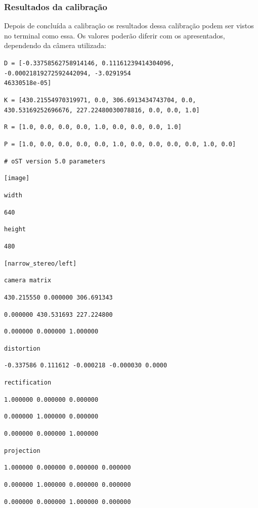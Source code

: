 \subsubsection{Resultados da calibração}

Depois de concluída a calibração os resultados dessa calibração podem ser vistos no terminal como essa. Os valores poderão diferir com os apresentados, dependendo da câmera utilizada:


{\setlength{\parindent}{0cm}

\texttt{D = {[}-0.33758562758914146, 0.11161239414304096, -0.00021819272592442094, -3.0291954\\46330518e-05{]}}

 \texttt{K = {[}430.21554970319971, 0.0, 306.6913434743704, 0.0, 430.53169252696676, 227.22480030078816, 0.0, 0.0, 1.0{]}}

\texttt{R = {[}1.0, 0.0, 0.0, 0.0, 1.0, 0.0, 0.0, 0.0, 1.0{]}}

\texttt{P = {[}1.0, 0.0, 0.0, 0.0, 0.0, 1.0, 0.0, 0.0, 0.0, 0.0, 1.0, 0.0{]}}

 \texttt{\# oST version 5.0 parameters}


 \texttt{{[}image{]}}


 \texttt{width}

 \texttt{640}



 \texttt{height}

 \texttt{480}



 \texttt{{[}narrow\_stereo/left{]}}


 \texttt{camera matrix}

 \texttt{430.215550 0.000000 306.691343}

 \texttt{0.000000 430.531693 227.224800}

 \texttt{0.000000 0.000000 1.000000}


 \texttt{distortion}

 \texttt{-0.337586 0.111612 -0.000218 -0.000030 0.0000}


 \texttt{rectification}

 \texttt{1.000000 0.000000 0.000000}

 \texttt{0.000000 1.000000 0.000000}

 \texttt{0.000000 0.000000 1.000000}


 \texttt{projection}

 \texttt{1.000000 0.000000 0.000000 0.000000}

 \texttt{0.000000 1.000000 0.000000 0.000000}

 \texttt{0.000000 0.000000 1.000000 0.000000}
}

